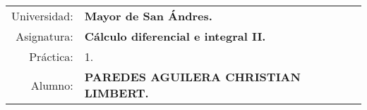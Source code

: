 \begin{tabular}{r l }
Universidad: & \textbf{Mayor de San Ándres.}\\
Asignatura: & \textbf{Cálculo diferencial e integral II.}\\
Práctica: & 1.\\ 
Alumno: & \textbf{PAREDES AGUILERA CHRISTIAN LIMBERT.}
\end{tabular}
\begin{flushleft}
\end{flushleft}
\vspace{.2cm}
